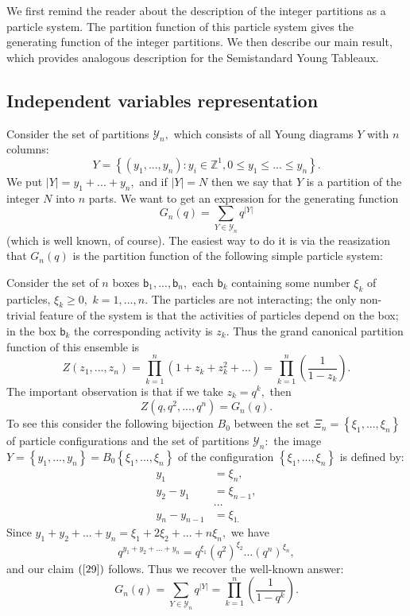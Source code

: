 \documentclass[12pt]{article}%
\begin{document}
We first remind the reader about the description of the integer partitions as
a particle system. The partition function of this particle system gives the
generating function of the integer partitions. We then describe our main
result, which provides analogous description for the Semistandard Young Tableaux.

\subsection{Independent variables representation}

Consider the set of partitions $\mathcal{Y}_{n},$ which consists of all Young
diagrams $Y$ with $n$ columns:%
\[
Y=\left\{  \left(  y_{1},...,y_{n}\right)  :y_{i}\in\mathbb{Z}^{1},0\leq
y_{1}\leq...\leq y_{n}\right\}  .
\]
We put $\left\vert Y\right\vert =y_{1}+...+y_{n},$ and if $\left\vert
Y\right\vert =N$ then we say that $Y$ is a partition of the integer $N$ into
$n$ parts. We want to get an expression for the generating function
\[
G_{n}\left(  q\right)  =\sum_{Y\in\mathcal{Y}_{n}}q^{\left\vert Y\right\vert }%
\]
(which is well known, of course). The easiest way to do it is via the
reasization that $G_{n}\left(  q\right)  $ is the partition function of the
following simple particle system:

Consider the set of $n$ boxes $\mathsf{b}_{1},...,\mathsf{b}_{n},$ each
$\mathsf{b}_{k}$ containing some number $\xi_{k}$ of particles, $\xi_{k}%
\geq0,$ $k=1,...,n.$ The particles are not interacting; the only non-trivial
feature of the system is that the activities of particles depend on the box;
in the box $\mathsf{b}_{k}$ the corresponding activity is $z_{k}.$ Thus the
grand canonical partition function of this ensemble is%
\[
Z\left(  z_{1},...,z_{n}\right)  =\prod_{k=1}^{n}\left(  1+z_{k}+z_{k}%
^{2}+...\right)  =\prod_{k=1}^{n}\left(  \frac{1}{1-z_{k}}\right)  .
\]
The important observation is that if we take $z_{k}=q^{k},$ then
\begin{equation}
Z\left(  q,q^{2},...,q^{n}\right)  =G_{n}\left(  q\right)  . \label{29}%
\end{equation}
To see this consider the following bijection $B_{0}$ between the set $\Xi
_{n}=\left\{  \xi_{1},...,\xi_{n}\right\}  $ of particle configurations and
the set of partitions $\mathcal{Y}_{n}:$ the image $Y=\left\{  y_{1}%
,...,y_{n}\right\}  =B_{0}\left\{  \xi_{1},...,\xi_{n}\right\}  $ of the
configuration $\left\{  \xi_{1},...,\xi_{n}\right\}  $ is defined by:%
\begin{align*}
y_{1}  &  =\xi_{n},\\
y_{2}-y_{1}  &  =\xi_{n-1},\\
&  ...\\
y_{n}-y_{n-1}  &  =\xi_{1.}%
\end{align*}
Since $y_{1}+y_{2}+...+y_{n}=\xi_{1}+2\xi_{2}+...+n\xi_{n},$ we have
\[
q^{y_{1}+y_{2}+...+y_{n}}=q^{\xi_{1}}\left(  q^{2}\right)  ^{\xi_{2}%
}...\left(  q^{n}\right)  ^{\xi_{n}},
\]
and our claim $\left(  \ref{29}\right)  $ follows. Thus we recover the
well-known answer:
\[
G_{n}\left(  q\right)  =\sum_{Y\in\mathcal{Y}_{n}}q^{\left\vert Y\right\vert
}=\prod_{k=1}^{n}\left(  \frac{1}{1-q^{k}}\right)  .
\]
\end{document}
